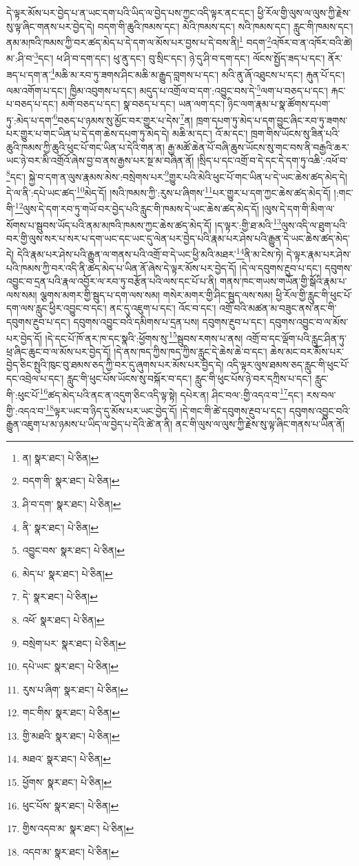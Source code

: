 དེ་ལྟར་མོས་པར་བྱེད་པ་ན་ཡང་དག་པའི་ཡིད་ལ་བྱེད་པས་ཀྱང་འདི་ལྟར་ནང་དང་། ཕྱི་རོལ་གྱི་ལུས་ལ་ལུས་ཀྱི་རྗེས་སུ་ལྟ་ཞིང་གནས་པར་བྱེད་དེ། བདག་གི་ཆུའི་ཁམས་དང་། མེའི་ཁམས་དང་། སའི་ཁམས་དང་། རླུང་གི་ཁམས་དང་། ནམ་མཁའི་ཁམས་ཀྱི་བར་ཚད་མེད་པ་དེ་དག་ལ་མོས་པར་བྱས་པ་དེ་བས་ནི།\footnote{ན།  སྣར་ཐང་།  པེ་ཅིན། } བདག་\footnote{བདག་གི་  སྣར་ཐང་།  པེ་ཅིན། }འཁོར་བ་ན་འཁོར་བའི་ཚེ། མ་:ཤི་བ་\footnote{ཤི་བ་དག་  སྣར་ཐང་།  པེ་ཅིན། }དང་། ཕ་ཤི་བ་དག་དང་། ཕུ་ནུ་དང་། བུ་སྲིང་དང་། ཉེ་དུ་ཤི་བ་དག་དང་། ལོངས་སྤྱོད་ཟད་པ་དང་། ནོར་ཟད་པ་དག་ན་\footnote{ནི་  སྣར་ཐང་།  པེ་ཅིན། }མཆི་མ་རབ་ཏུ་ཟགས་ཤིང་མཆི་མ་རྒྱུད་བླགས་པ་དང་། མའི་ནུ་ཞོ་འཐུངས་པ་དང་། རྐུན་པོ་དང་། ལམ་འགོག་པ་དང་། ཁྱིམ་འབུགས་པ་དང་། མདུད་པ་འགྲོལ་བ་དག་:འབྱུང་བས་དེ་\footnote{འབྱུང་བས་  སྣར་ཐང་།  པེ་ཅིན། }ལག་པ་བཅད་པ་དང་། རྐང་པ་བཅད་པ་དང་། མགོ་བཅད་པ་དང་། སྣ་བཅད་པ་དང་། ཡན་ལག་དང་། ཉིང་ལག་རྣམ་པ་སྣ་ཚོགས་དཔག་ཏུ་:མེད་པ་དག་\footnote{མེད་པ་  སྣར་ཐང་།  པེ་ཅིན། }བཅད་པ་ཉམས་སུ་མྱོང་བར་གྱུར་པ་དེས་\footnote{དེ་  སྣར་ཐང་།  པེ་ཅིན། }ན། ཁྲག་དཔག་ཏུ་མེད་པ་དག་བྱུང་ཞིང་རབ་ཏུ་ཟགས་པར་གྱུར་པ་གང་ཡིན་པ་དེ་དག་ཆེས་དཔག་ཏུ་མེད་དེ། མཆི་མ་དང་། འོ་མ་དང་། ཁྲག་གིས་ཡོངས་སུ་ཟིན་པའི་ཆུའི་ཁམས་ཀྱི་ཆུའི་ཕུང་པོ་གང་ཡིན་པ་དེའི་གན་ན། རྒྱ་མཚོ་ཆེན་པོ་བཞི་ཆུས་ཡོངས་སུ་གང་བས་ནི་བརྒྱའི་ཆར་ཡང་ཉེ་བར་མི་འགྲོའོ་ཞེས་བྱ་བ་ནས་རྒྱས་པར་སྔ་མ་བཞིན་ནོ། །སྲིད་པ་དང་འགྲོ་བ་དེ་དང་དེ་དག་ཏུ་འཆི་:འཕོ་བ་\footnote{འཕོ་  སྣར་ཐང་།  པེ་ཅིན། }དང་། སྐྱེ་བ་དག་ན་ལུས་རྣམས་མེས་:བསྲེགས་པར་\footnote{བསྲེག་པར་  སྣར་ཐང་།  པེ་ཅིན། }གྱུར་པའི་མེའི་ཕུང་པོ་གང་ཡིན་པ་དེ་ཡང་ཆེས་ཚད་མེད་དེ། དེ་ལ་ནི་:དཔེ་ཡང་ཚད་\footnote{དཔེ་ཡང་  སྣར་ཐང་།  པེ་ཅིན། }མེད་དོ། །སའི་ཁམས་ཀྱི་:རུས་པ་ཞིགས་\footnote{རུས་པ་ཞིག་  སྣར་ཐང་།  པེ་ཅིན། }པར་གྱུར་པ་དག་ཀྱང་ཆེས་ཚད་མེད་དོ། །:གང་གི་\footnote{གང་གིས་  སྣར་ཐང་།  པེ་ཅིན། }ལུས་དེ་དག་རབ་ཏུ་གཡོ་བར་བྱེད་པའི་རླུང་གི་ཁམས་དེ་ཡང་ཆེས་ཚད་མེད་དོ། །ལུས་དེ་དག་གི་མིག་ལ་སོགས་པ་སྦུབས་ཡོད་པའི་ནམ་མཁའི་ཁམས་ཀྱང་ཆེས་ཚད་མེད་དོ། །ད་ལྟར་:གྱི་ཐ་མའི་\footnote{གྱི་མཐའི་  སྣར་ཐང་།  པེ་ཅིན། }ལུས་འདི་ལ་ཐུག་པའི་བར་གྱི་ལུས་སར་པ་སར་པ་དག་ཡང་དང་ཡང་དུ་ལེན་པར་བྱེད་པའི་རྣམ་པར་ཤེས་པའི་རྒྱུན་དེ་ཡང་ཆེས་ཚད་མེད་དེ། དེའི་རྣམ་པར་ཤེས་པའི་རྒྱུན་ལ་གནས་པའི་འགྲོ་བ་དེ་ཡང་ཕྱི་མའི་མཐར་\footnote{མཐའ་  སྣར་ཐང་།  པེ་ཅིན། }ནི་མ་ངེས་ཏེ། དེ་ལྟར་རྣམ་པར་ཤེས་པའི་ཁམས་ཀྱི་བར་འདི་ནི་ཚད་མེད་པ་ཡིན་ནོ་ཞེས་དེ་ལྟར་མོས་པར་བྱེད་དོ། །དེ་ལ་དབུགས་རྔུབ་པ་དང་། དབུགས་འབྱུང་བ་དྲན་པའི་རྣལ་འབྱོར་ལ་རབ་ཏུ་བརྩོན་པའི་ལས་དང་པོ་པ་ནི། གནས་ཁང་གཡས་གཡོན་གྱི་སྒོའི་རྣམ་པ་ལས་སམ། ལྕགས་མགར་གྱི་སྦུད་པ་དག་ལས་སམ། གསེར་མགར་གྱི་ཤིང་སྦུད་ལས་སམ། ཕྱི་རོལ་གྱི་རླུང་གི་ཕུང་པོ་དག་ལས་རླུང་ཕྱིར་འབྱུང་བ་དང་། ནང་དུ་འཇུག་པ་དང་། འོང་བ་དང་། འགྲོ་བའི་མཚན་མ་བཟུང་ནས་ནང་གི་དབུགས་རྔུབ་པ་དང་། དབུགས་འབྱུང་བའི་དམིགས་པ་དྲན་པས། དབུགས་རྔུབ་པ་དང་། དབུགས་འབྱུང་བ་ལ་མོས་པར་བྱེད་དོ། །དེ་དང་པོ་ཁོ་ནར་ཁ་དང་སྣའི་:ཕྱོགས་སུ་\footnote{ཕྱོགས་  སྣར་ཐང་།  པེ་ཅིན། }སྦུབས་རགས་པ་ནས། འགྲོ་བ་དང་ལྡོག་པའི་རླུང་ཤིན་ཏུ་ཕྲ་ཞིང་ཆུང་བ་ལ་མོས་པར་བྱེད་དོ། །དེ་ནས་ཁད་ཀྱིས་ཁད་ཀྱིས་རླུང་དེ་ཆེས་ཆེ་བ་དང་། ཆེས་མང་བར་མོས་པར་བྱེད་ཅིང་སྤུའི་ཁུང་བུ་ཐམས་ཅད་ཀྱི་བར་དུ་ཞུགས་པར་མོས་པར་བྱེད་དེ། འདི་ལྟར་ལུས་ཐམས་ཅད་རླུང་གི་ཕུང་པོ་དང་འབྲེལ་པ་དང་། རླུང་གི་ཕུང་པོས་ཡོངས་སུ་བསྐོར་བ་དང་། རླུང་གི་ཕུང་པོས་ཉེ་བར་དཀྲིས་པ་དང་། རླུང་གི་:ཕུང་པོ་\footnote{ཕུང་པོས་  སྣར་ཐང་།  པེ་ཅིན། }ཚད་མེད་པའི་ནང་ན་འདུག་ཅིང་འདི་ལྟ་སྟེ། དཔེར་ན། ཤིང་བལ་:གྱི་འདའ་བ་\footnote{གྱིས་འདབ་མ་  སྣར་ཐང་།  པེ་ཅིན། }དང་། རས་བལ་གྱི་:འདའ་བ་\footnote{འདབ་མ་  སྣར་ཐང་།  པེ་ཅིན། }ལྟར་ཡང་བ་ཉིད་དུ་མོས་པར་ཡང་བྱེད་དོ། །དེ་གང་གི་ཚེ་དབུགས་རྔུབ་པ་དང་། དབུགས་འབྱུང་བའི་རྒྱུན་འཇུག་པ་མ་ཉམས་པ་ཡིད་ལ་བྱེད་པ་དེའི་ཚེ་ན་ནི། ནང་གི་ལུས་ལ་ལུས་ཀྱི་རྗེས་སུ་ལྟ་ཞིང་གནས་པ་ཡིན་ནོ། 